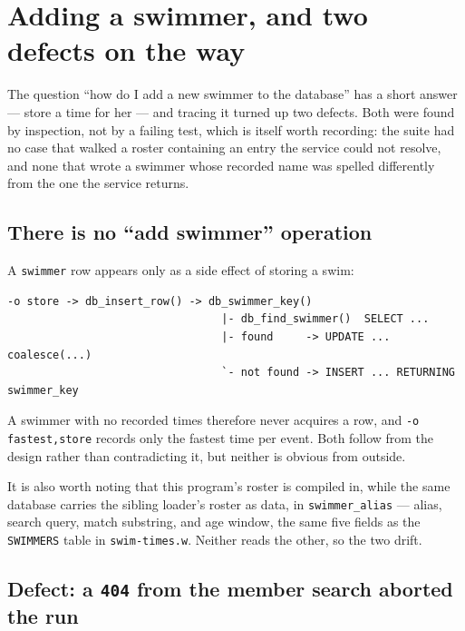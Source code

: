 \documentclass[11pt]{article}
\newcommand{\code}[1]{\texttt{#1}}
\begin{document}
\section{Adding a swimmer, and two defects on the way}\label{sec:roster}

The question ``how do I add a new swimmer to the database'' has a short
answer --- store a time for her --- and tracing it turned up two defects.
Both were found by inspection, not by a failing test, which is itself
worth recording: the suite had no case that walked a roster containing
an entry the service could not resolve, and none that wrote a swimmer
whose recorded name was spelled differently from the one the service
returns.

\subsection{There is no ``add swimmer'' operation}

A \code{swimmer} row appears only as a side effect of storing a swim:

\begin{lstlisting}
-o store -> db_insert_row() -> db_swimmer_key()
                                 |- db_find_swimmer()  SELECT ...
                                 |- found     -> UPDATE ... coalesce(...)
                                 `- not found -> INSERT ... RETURNING swimmer_key
\end{lstlisting}

\noindent A swimmer with no recorded times therefore never acquires a
row, and \code{-o fastest,store} records only the fastest time per
event.  Both follow from the design rather than contradicting it, but
neither is obvious from outside.

It is also worth noting that this program's roster is compiled in,
while the same database carries the sibling loader's roster as data, in
\code{swimmer\_alias} --- alias, search query, match substring, and age
window, the same five fields as the \code{SWIMMERS} table in
\code{swim-times.w}.  Neither reads the other, so the two drift.

\subsection{Defect: a \code{404} from the member search aborted the run}
\end{document}
